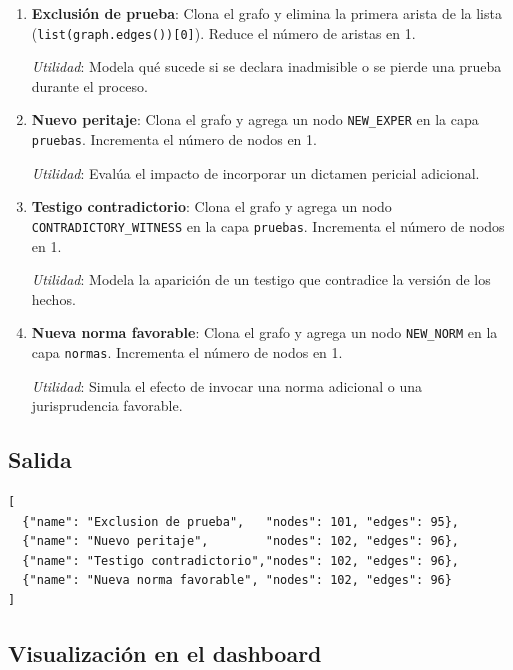 \documentclass[12pt, letterpaper]{article}
\begin{document}
\begin{enumerate}[nosep]
  \item \textbf{Exclusión de prueba}: Clona el grafo y elimina la
    primera arista de la lista (\texttt{list(graph.edges())[0]}).
    Reduce el número de aristas en 1.

    \textit{Utilidad}: Modela qué sucede si se declara inadmisible
    o se pierde una prueba durante el proceso.

  \item \textbf{Nuevo peritaje}: Clona el grafo y agrega un nodo
    \texttt{NEW\_EXPER} en la capa \texttt{pruebas}. Incrementa el
    número de nodos en 1.

    \textit{Utilidad}: Evalúa el impacto de incorporar un dictamen
    pericial adicional.

  \item \textbf{Testigo contradictorio}: Clona el grafo y agrega un
    nodo \texttt{CONTRADICTORY\_WITNESS} en la capa \texttt{pruebas}.
    Incrementa el número de nodos en 1.

    \textit{Utilidad}: Modela la aparición de un testigo que
    contradice la versión de los hechos.

  \item \textbf{Nueva norma favorable}: Clona el grafo y agrega un
    nodo \texttt{NEW\_NORM} en la capa \texttt{normas}. Incrementa
    el número de nodos en 1.

    \textit{Utilidad}: Simula el efecto de invocar una norma
    adicional o una jurisprudencia favorable.
\end{enumerate}

\subsection{Salida}

\begin{lstlisting}[caption={Ejemplo de respuesta del simulador}]
[
  {"name": "Exclusion de prueba",   "nodes": 101, "edges": 95},
  {"name": "Nuevo peritaje",        "nodes": 102, "edges": 96},
  {"name": "Testigo contradictorio","nodes": 102, "edges": 96},
  {"name": "Nueva norma favorable", "nodes": 102, "edges": 96}
]
\end{lstlisting}

\subsection{Visualización en el dashboard}
\end{document}
